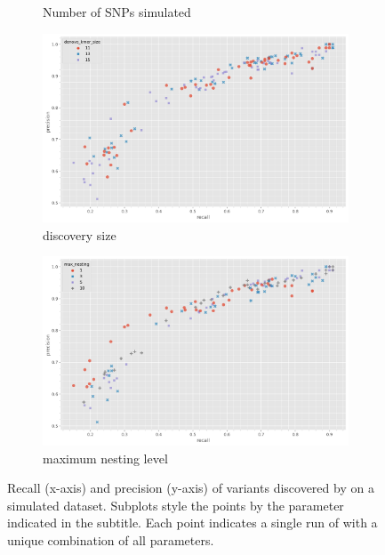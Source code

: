 \begin{figure}
\begin{subfigure}[b]{0.475\textwidth}
         \caption{Number of SNPs simulated}
         \label{fig:denovo-sims-num-snps}
     \end{subfigure}
     \begin{subfigure}[b]{0.475\textwidth}
        \includegraphics[width=1\linewidth]{Chapter1/Figs/denovo_precrec_kmer.png}
        \centering
        \caption{\denovo{} discovery \kmer{} size}
        \label{fig:denovo-sims-kmer-size}
     \end{subfigure}
     \begin{subfigure}[b]{0.475\textwidth}
         \centering
        \includegraphics[width=1\linewidth]{Chapter1/Figs/denovo_precrec_nesting.png}
         \caption{\prg{} maximum nesting level}
         \label{fig:denovo-sims-nesting}
     \end{subfigure}
    \caption{Recall (x-axis) and precision (y-axis) of \denovo{} variants discovered by \pandora{} on a simulated dataset. Subplots style the points by the parameter indicated in the subtitle. Each point indicates a single run of \pandora{} with a unique combination of all parameters.}
        \label{fig:denovo-sims}
\end{figure}

